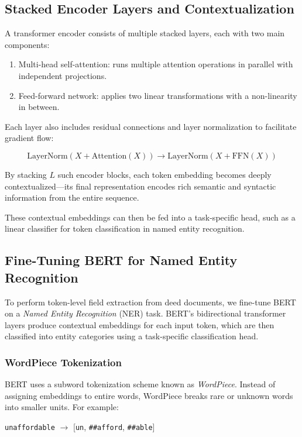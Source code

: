 \documentclass{article}
\begin{document}
\subsection{Stacked Encoder Layers and Contextualization}

A transformer encoder consists of multiple stacked layers, each with two main components:
\begin{enumerate}
  \item Multi-head self-attention: runs multiple attention operations in parallel with independent projections.
  \item Feed-forward network: applies two linear transformations with a non-linearity in between.
\end{enumerate}

Each layer also includes residual connections and layer normalization to facilitate gradient flow:

\[
\text{LayerNorm}(X + \text{Attention}(X)) \rightarrow \text{LayerNorm}(X + \text{FFN}(X))
\]

By stacking $L$ such encoder blocks, each token embedding becomes deeply contextualized—its final representation encodes rich semantic and syntactic information from the entire sequence.

These contextual embeddings can then be fed into a task-specific head, such as a linear classifier for token classification in named entity recognition.

\subsection{Fine-Tuning BERT for Named Entity Recognition}

To perform token-level field extraction from deed documents, we fine-tune BERT on a \emph{Named Entity Recognition} (NER) task. BERT's bidirectional transformer layers produce contextual embeddings for each input token, which are then classified into entity categories using a task-specific classification head.

\subsubsection{WordPiece Tokenization}

BERT uses a subword tokenization scheme known as \emph{WordPiece}. Instead of assigning embeddings to entire words, WordPiece breaks rare or unknown words into smaller units. For example:

\begin{center}
    \texttt{unaffordable} $\rightarrow$ [\texttt{un}, \texttt{\#\#afford}, \texttt{\#\#able}]
\end{center}
\end{document}
